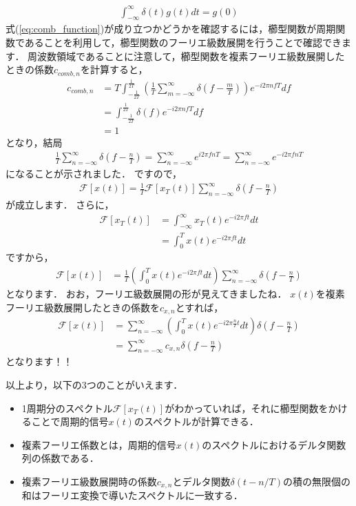 \begin{align}
\int_{-\infty}^{\infty} \delta(t) g(t) dt = g(0) \label{eq:delta}
\end{align}
式(\ref{eq:comb_function})が成り立つかどうかを確認するには，櫛型関数が周期関数であることを利用して，櫛型関数のフーリエ級数展開を行うことで確認できます．
周波数領域であることに注意して，櫛型関数を複素フーリエ級数展開したときの係数$c_{comb, n}$を計算すると，
\begin{align}
c_{comb, n} &= T \int_{-\frac{1}{2T}}^{\frac{1}{2T}} \left( \frac{1}{T} \sum_{m=-\infty}^{\infty} \delta\left(f - \frac{m}{T}\right) \right) e^{-i 2\pi n f T} df \nonumber\\
    &= \int_{-\frac{1}{2T}}^{\frac{1}{2T}} \delta(f) e^{-i 2\pi n f T} df \nonumber\\
    &= 1
\end{align}
となり，結局
\begin{align}
\frac{1}{T} \sum_{n=-\infty}^{\infty} \delta\left(f - \frac{n}{T}\right) = \sum_{n=-\infty}^{\infty}  e^{i2 \pi f nT} = \sum_{n=-\infty}^{\infty}  e^{-i2 \pi f nT}
\end{align}
になることが示されました．
ですので，
\begin{align}
\mathcal{F}[x(t)] = \frac{1}{T} \mathcal{F}[x_T(t)] \sum_{n=-\infty}^{\infty} \delta\left(f - \frac{n}{T}\right)
\end{align}
が成立します．
さらに，
\begin{align}
\mathcal{F}[x_T(t)] &= \int_{-\infty}^{\infty} x_T(t) e^{-i2\pi ft} dt \nonumber\\
    &= \int_{0}^{T} x(t) e^{-i2\pi ft} dt
\end{align}
ですから，
\begin{align}
\mathcal{F}[x(t)] &= \frac{1}{T} \left(\int_{0}^{T} x(t) e^{-i2\pi ft} dt\right) \sum_{n=-\infty}^{\infty} \delta\left(f - \frac{n}{T}\right)
\end{align}
となります．
おお，フーリエ級数展開の形が見えてきましたね．
$x(t)$を複素フーリエ級数展開したときの係数を$c_{x,n}$とすれば，
\begin{align}
\mathcal{F}[x(t)] &= \sum_{n=-\infty}^{\infty} \left(\int_0^T x(t) e^{-i2\pi \frac{n}{T} t} dt \right) \delta\left(f - \frac{n}{T}\right) \nonumber\\
                  &= \sum_{n=-\infty}^{\infty} c_{x,n} \delta\left(f - \frac{n}{T}\right)
\end{align}
となります！！

以上より，以下の3つのことがいえます．
\begin{itemize}
\item 1周期分のスペクトル$\mathcal{F}[x_T(t)]$がわかっていれば，それに櫛型関数をかけることで周期的信号$x(t)$のスペクトルが計算できる．
\item 複素フーリエ係数とは，周期的信号$x(t)$のスペクトルにおけるデルタ関数列の係数である．
\item 複素フーリエ級数展開時の係数$c_{x,n}$とデルタ関数$\delta(t-n/T)$の積の無限個の和はフーリエ変換で導いたスペクトルに一致する．
\end{itemize}



